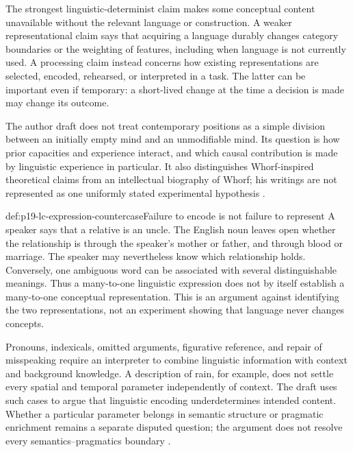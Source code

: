 The strongest linguistic-determinist claim makes some conceptual content
unavailable without the relevant language or construction. A weaker
representational claim says that acquiring a language durably changes
category boundaries or the weighting of features, including when language
is not currently used. A processing claim instead concerns how existing
representations are selected, encoded, rehearsed, or interpreted in a task.
The latter can be important even if temporary: a short-lived change at the
time a decision is made may change its outcome.

The author draft does not treat contemporary positions as a simple division
between an initially empty mind and an unmodifiable mind. Its question is
how prior capacities and experience interact, and which causal contribution
is made by linguistic experience in particular. It also distinguishes
Whorf-inspired theoretical claims from an intellectual biography of Whorf;
his writings are not represented as one uniformly stated experimental
hypothesis \cite[author-draft pp.~5--10,17]{GleitmanPapafragouLanguageThoughtAuthorDraftLC}.

\begin{hbexample}{def:p19-lc-expression-countercase}{Failure to encode is not failure to represent}
A speaker says that a relative is an uncle. The English noun leaves open
whether the relationship is through the speaker's mother or father, and
through blood or marriage. The speaker may nevertheless know which
relationship holds. Conversely, one ambiguous word can be associated with
several distinguishable meanings. Thus a many-to-one linguistic expression
does not by itself establish a many-to-one conceptual representation.
This is an argument against identifying the two representations, not an
experiment showing that language never changes concepts.
\end{hbexample}

Pronouns, indexicals, omitted arguments, figurative reference, and repair
of misspeaking require an interpreter to combine linguistic information
with context and background knowledge. A description of rain, for example,
does not settle every spatial and temporal parameter independently of
context. The draft uses such cases to argue that linguistic encoding
underdetermines intended content. Whether a particular parameter belongs
in semantic structure or pragmatic enrichment remains a separate disputed
question; the argument does not resolve every semantics--pragmatics boundary
\cite[author-draft pp.~10--17]{GleitmanPapafragouLanguageThoughtAuthorDraftLC}.

